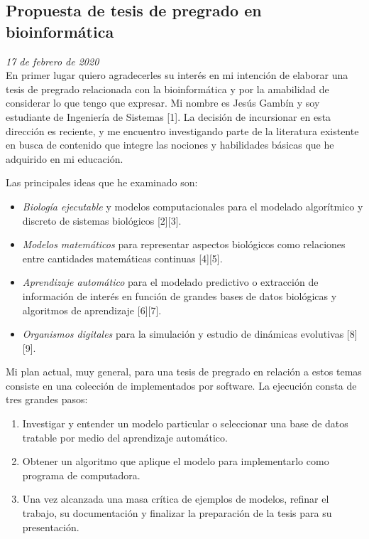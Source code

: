 \documentclass[12pt]{article}
\begin{document}
	\subsection{Propuesta de tesis de pregrado en bioinformática}

	\textit{17 de febrero de 2020}\\

	En primer lugar quiero agradecerles su interés en mi intención de
	elaborar una tesis de pregrado relacionada con la bioinformática y por
	la amabilidad de considerar lo que tengo que expresar. Mi nombre es
	Jesús Gambín y soy estudiante de Ingeniería de Sistemas [1]. La
	decisión de incursionar en esta dirección es reciente, y me encuentro
	investigando parte de la literatura existente en busca de contenido que
	integre las nociones y habilidades básicas que he adquirido en mi
	educación.

	Las principales ideas que he examinado son:

	\begin{itemize}
	\item
		\textit{Biología ejecutable} y modelos computacionales para el
		modelado algorítmico y discreto de sistemas biológicos [2][3].
	\item
		\textit{Modelos matemáticos} para representar aspectos
		biológicos como relaciones entre cantidades matemáticas
		continuas [4][5].
	\item
		\textit{Aprendizaje automático} para el modelado predictivo o
		extracción de información de interés en función de grandes
		bases de datos biológicas y algoritmos de aprendizaje [6][7].
	\item
		\textit{Organismos digitales} para la simulación y estudio de
		dinámicas evolutivas [8][9].
	\end{itemize}

	Mi plan actual, muy general, para una tesis de pregrado en relación a
	estos temas consiste en una colección de 
	implementados por software. La ejecución consta de tres grandes pasos:

	\begin{enumerate}
	\item
		Investigar y entender un modelo particular o seleccionar una
		base de datos tratable por medio del aprendizaje automático.
	\item
		Obtener un algoritmo que aplique el modelo para implementarlo
		como programa de computadora.
	\item
		Una vez alcanzada una masa crítica de ejemplos de modelos,
		refinar el trabajo, su documentación y finalizar la preparación
		de la tesis para su presentación.
	\end{enumerate}
\end{document}
